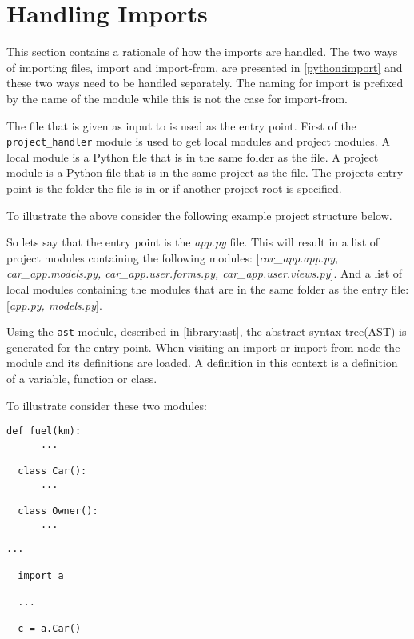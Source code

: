 \section{Handling Imports}
This section contains a rationale of how the imports are handled.
The two ways of importing files, import and import-from, are presented in \cref{python:import} and these two ways need to be handled separately.
The naming for import is prefixed by the name of the module while this is not the case for import-from.


The file that is given as input to \pyt{} is used as the entry point.
First of the \texttt{project\_handler} module is used to get local modules and project modules.
A local module is a Python file that is in the same folder as the file.
A project module is a Python file that is in the same project as the file.
The projects entry point is the folder the file is in or if another project root is specified.

To illustrate the above consider the following example project structure below.


So lets say that the entry point is the \textit{app.py} file.
This will result in a list of project modules containing the following modules: [\textit{car\_app.app.py, car\_app.models.py, car\_app.user.forms.py, car\_app.user.views.py}].
And a list of local modules containing the modules that are in the same folder as the entry file: [\textit{app.py, models.py}].


Using the \texttt{ast} module, described in \cref{library:ast}, the abstract syntax tree(AST) is generated for the entry point.
When visiting an import or import-from node the module and its definitions are loaded.
A definition in this context is a definition of a variable, function or class.

To illustrate consider these two modules:

\begin{lstlisting}[style=python, caption={A module that defines a function and two classes called \texttt{a}}, label={import:definition_module}]
  def fuel(km):
      ...

  class Car():
      ...

  class Owner():
      ...
\end{lstlisting}
\begin{lstlisting}[style=python, caption={A module called \texttt{b} importing the above module \texttt{a}}, label={import:import_module}]
  ...
  
  import a
  
  ...

  c = a.Car()
\end{lstlisting}


